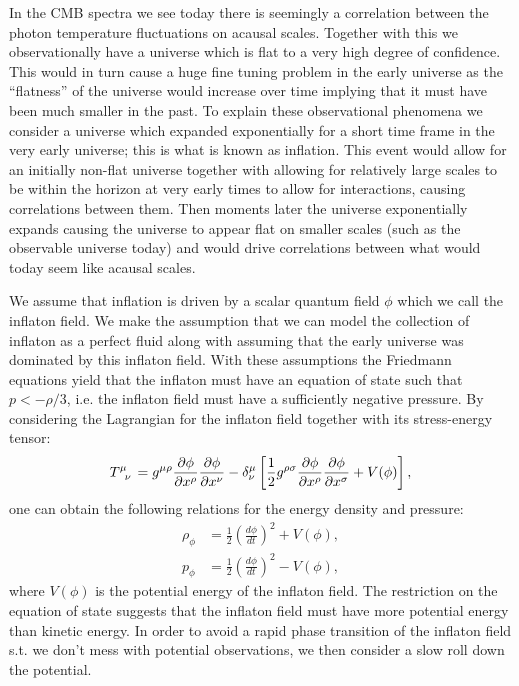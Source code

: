 \documentclass[%
reprint,
 amsmath,amssymb,
 aps,
]{revtex4-2}
\begin{document}
In the CMB spectra we see today there is seemingly a correlation between the photon temperature fluctuations on acausal scales. Together with this we observationally have a universe which is flat to a very high degree of confidence. This would in turn cause a huge fine tuning problem in the early universe as the ``flatness'' of the universe would increase over time implying that it must have been much smaller in the past. To explain these observational phenomena we consider a universe which expanded exponentially for a short time frame in the very early universe; this is what is known as inflation. This event would allow for an initially non-flat universe together with allowing for relatively large scales to be within the horizon at very early times to allow for interactions, causing correlations between them. Then moments later the universe exponentially expands causing the universe to appear flat on smaller scales (such as the observable universe today) and would drive correlations between what would today seem like acausal scales. 

We assume that inflation is driven by a scalar quantum field $\phi$ which we call the inflaton field. We make the assumption that we can model the collection of inflaton as a perfect fluid along with assuming that the early universe was dominated by this inflaton field. With these assumptions the Friedmann equations yield that the inflaton must have an equation of state such that $p<-\rho/3$, i.e. the inflaton field must have a sufficiently negative pressure. By considering the Lagrangian for the inflaton field together with its stress-energy tensor: \cite{Dodelson:2003ft}
\[\tensor{T}{^\mu_\nu}=g^{\mu\rho}\pdv{\phi}{x^\rho}\pdv{\phi}{x^\nu}-\delta^\mu_\nu\left[\frac{1}{2}g^{\rho\sigma}\pdv{\phi}{x^\rho}\pdv{\phi}{x^\sigma}+V(\phi)\right],\]
one can obtain the following relations for the energy density and pressure:
\begin{align*}
	\rho_\phi&=\frac{1}{2}\left(\frac{d\phi}{dt}\right)^2+V(\phi),\\
	p_\phi&=\frac{1}{2}\left(\frac{d\phi}{dt}\right)^2-V(\phi),
\end{align*}
where $V(\phi)$ is the potential energy of the inflaton field. The restriction on the equation of state suggests that the inflaton field must have more potential energy than kinetic energy. In order to avoid a rapid phase transition of the inflaton field s.t. we don't mess with potential observations, we then consider a slow roll down the potential. 
\end{document}
